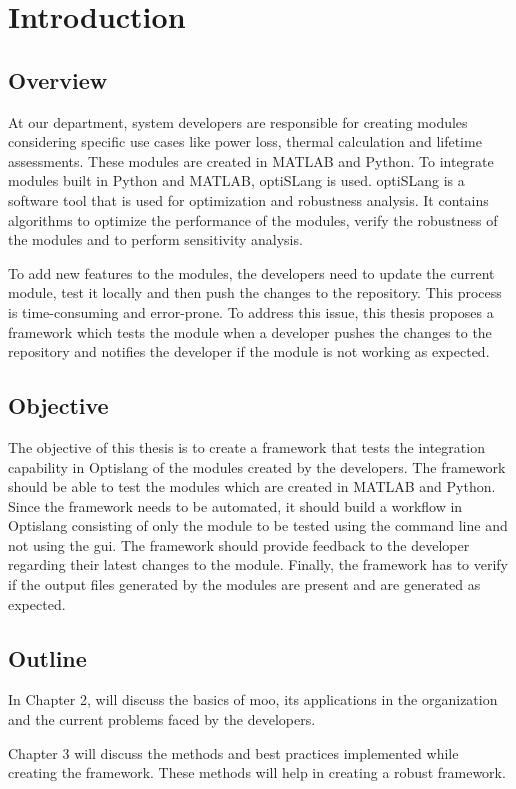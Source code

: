 \chapter{Introduction}
\section{Overview}
At our department, system developers are responsible for creating modules considering specific use cases like power loss, thermal calculation and
lifetime assessments. These modules are created in MATLAB and Python. To integrate modules built in Python and MATLAB, optiSLang is used. optiSLang is a software 
tool that is used for optimization and robustness analysis. It contains algorithms to optimize the performance of the modules, verify the robustness of the 
modules and to perform sensitivity analysis. 

To add new features to the modules, the developers need to update the current module, test it locally and then push the changes to the repository.
This process is time-consuming and error-prone. To address this issue, this thesis proposes a framework which tests the module when a developer pushes the 
changes to the repository and notifies the developer if the module is not working as expected. 

\section{Objective}
The objective of this thesis is to create a framework that tests the integration capability in Optislang of the modules created by the developers. The framework should be able to test the modules which 
are created in MATLAB and Python. Since the framework needs to be automated, it should build a workflow in Optislang consisting of only the module to be tested using the command line and not using the \acrshort{gui}.
The framework should provide feedback to the developer regarding their latest changes to the module. Finally, the framework has to verify if the output 
files generated by the modules are present and are generated as expected.

\section{Outline}
In Chapter 2, will discuss the basics of \acrlong{moo}, its applications in the organization and the current problems faced by the developers.

Chapter 3 will discuss the methods and best practices implemented while creating the framework. These methods will help in creating a robust framework.

